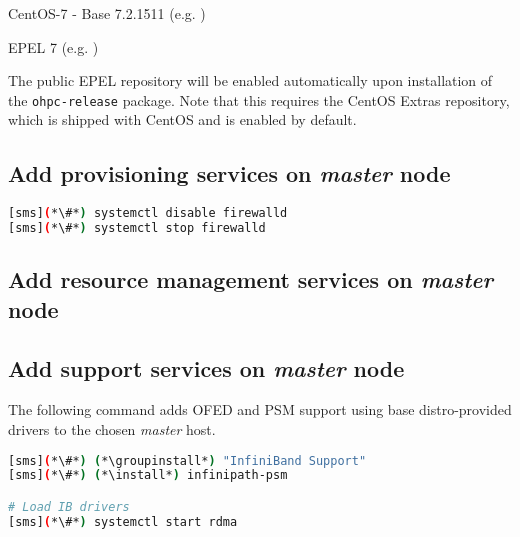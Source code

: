 \documentclass[letterpaper]{article}
\newcommand{\install}{yum -y install}
\newcommand{\groupinstall}{yum -y groupinstall}
\begin{document}
\begin{itemize*}
\item CentOS-7 - Base 7.2.1511
  (e.g. \href{http://mirror.centos.org/centos-7/7.2.1511/os/x86\_64}
             {\color{blue}{http://mirror.centos.org/centos-7/7.2.1511/os/x86\_64}} )
\item EPEL 7 (e.g. \href{http://download.fedoraproject.org/pub/epel/7/x86\_64}
                        {\color{blue}{http://download.fedoraproject.org/pub/epel/7/x86\_64}} )
\end{itemize*}

\noindent The public EPEL repository will be enabled automatically upon installation of the 
\texttt{ohpc-release} package. Note that this requires the CentOS Extras
repository, which is shipped with CentOS and is enabled by default.




\subsection{Add provisioning services on {\em master} node} \label{sec:add_provisioning}



\begin{lstlisting}[language=bash,keywords={}]
[sms](*\#*) systemctl disable firewalld
[sms](*\#*) systemctl stop firewalld
\end{lstlisting}





\subsection{Add resource management services on {\em master} node} \label{sec:add_rm}


\subsection{Add \InfiniBand{} support services on {\em master} node} \label{sec:add_ofed}

The following command adds OFED and PSM support using base distro-provided drivers
to the chosen {\em master} host.

\begin{lstlisting}[language=bash,keywords={}]
[sms](*\#*) (*\groupinstall*) "InfiniBand Support"
[sms](*\#*) (*\install*) infinipath-psm

# Load IB drivers
[sms](*\#*) systemctl start rdma
\end{lstlisting}
\end{document}
